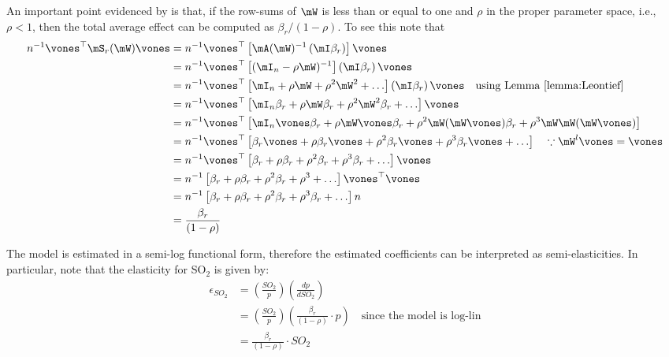 \documentclass[english,12pt]{book}\usepackage[]{graphicx}\usepackage[]{xcolor}
\begin{document}
\begin{example}
An important point evidenced by \cite{kim2003measuring} is that, if  the row-sums of $\mW$ is less than or equal to one and $\rho$ in the proper parameter space, i.e., $\rho < 1$, then the total average effect can be computed as $\beta_r / (1-\rho)$. To see this note that
\begin{equation}\label{eq:total_effect_simple}
  \begin{aligned}
    n^{-1}\vones^\top\mS_r(\mW)\vones & = n^{-1}\vones^\top\left[\mA(\mW)^{-1}\left(\mI\beta_r\right)\right]\vones \\
                                  & = n^{-1}\vones^\top\left[(\mI_n - \rho\mW)^{-1}\right]\left(\mI\beta_r\right)\vones \\
                                  & =   n^{-1}\vones^\top\left[\mI_n + \rho\mW + \rho^2\mW^2 + \ldots \right]\left(\mI\beta_r\right)\vones \quad\mbox{using Lemma \ref{lemma:Leontief}} \\
                                  & = n^{-1} \vones^\top\left[\mI_n\beta_r + \rho\mW\beta_r + \rho^2\mW^2\beta_r + \ldots \right]\vones \\
                                  & = n^{-1} \vones^\top\left[\mI_n\vones\beta_r + \rho\mW\vones\beta_r + \rho^2\mW(\mW\vones)\beta_r + \rho^3\mW\mW(\mW\vones) \right] \\
                                  & = n^{-1} \vones^\top\left[\beta_r\vones + \rho\beta_r\vones + \rho^2\beta_r\vones + \rho^3\beta_r\vones + \ldots \right]\quad \because \mW^l\vones = \vones \\
                                  & = n^{-1} \vones^\top\left[\beta_r + \rho\beta_r + \rho^2\beta_r + \rho^3\beta_r + \ldots \right]\vones\\
                                  & = n^{-1} \left[\beta_r + \rho\beta_r + \rho^2\beta_r + \rho^3 + \ldots \right] \vones^\top\vones\\
                                  & = n^{-1} \left[\beta_r + \rho\beta_r + \rho^2\beta_r + \rho^3\beta_r + \ldots \right] n \\
                                  & = \frac{\beta_r}{(1 - \rho)}
  \end{aligned}
\end{equation}

The model is estimated in a semi-log functional form, therefore the estimated coefficients can be interpreted as semi-elasticities. In particular, note that the elasticity for SO$_2$ is given by:
\begin{equation}
  \begin{aligned}
    \epsilon_{SO_2} & = \left(\frac{SO_2}{p}\right)\left(\frac{d p}{d SO_2}\right) \\
                      & = \left(\frac{SO_2}{p}\right)\left(\frac{\beta_r}{(1 - \rho)}\cdot p\right)\quad \mbox{since the model is log-lin} \\
                      & = \frac{\beta_r}{(1 - \rho)}\cdot SO_2
  \end{aligned}
\end{equation}


\end{example}
\end{document}
